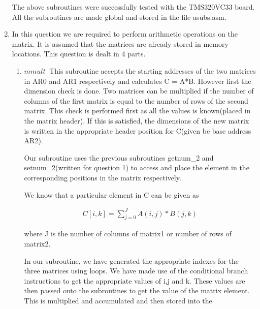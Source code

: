 \documentclass[a4paper,12pt]{article}
\begin{document}
\begin{enumerate}
  
  \begin{flushleft}
   The above subroutines were successfully tested with the TMS320VC33 board. All the subroutines are made global and stored in
   the file asubs.asm.
  \end{flushleft}
  \item
  \begin{flushleft}
   In this question we are required to perform arithmetic operations on the matrix. It is assumed that the matrices are already
   stored in memory locations. This question is dealt in 4 parts. 
   \begin{enumerate}
    \item
    \begin{flushleft}
     $mmult\ $ This subroutine accepts the starting addresses of the two matrices in AR0 and AR1 respectively and calculates
     C = A*B. However first the dimension check is done. Two matrices can be multiplied if the number of columns of the 
     first matrix is equal to the number of rows of the second matrix. This check is performed first as all the values is 
     known(placed in the matrix header). If this is satisfied, the dimensions of the new matrix is written in the appropriate
     header position for C(given be base address AR2). 
    \end{flushleft}
    \begin{flushleft}
     Our subroutine uses the previous subroutines getnum\_2 and setnum\_2(written for question 1) to access and place the 
     element in the corresponding positions in the matrix respectively. 
    \end{flushleft}
    \begin{flushleft}
     We know that a particular element in C can be given as
    \end{flushleft}
    \begin{align}
     C[i,k] = \sum^{J}_{j=0} A(i,j)*B(j,k) \nonumber
    \end{align}
    \begin{flushleft}
     where J is the number of columns of matrix1 or number of rows of matrix2.
    \end{flushleft}
    \begin{flushleft}
     In our subroutine, we have generated the appropriate indexes for the three matrices using loops. We have made use of 
     the conditional branch instructions to get the appropriate values of i,j and k. These values are then passed onto 
     the subroutines to get the value of the matrix element. This is multiplied and accumulated and then stored into the 

\end{flushleft}
\end{enumerate}
\end{flushleft}
\end{enumerate}
\end{document}
